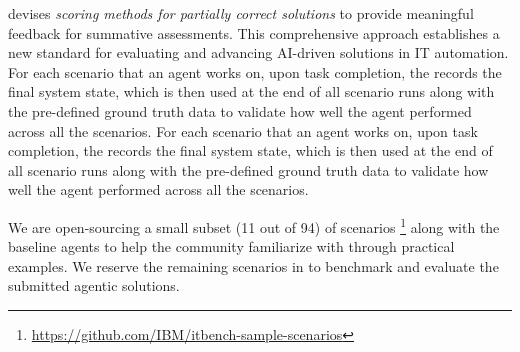 \bench devises \textit{scoring methods for partially correct solutions} to provide meaningful feedback for summative assessments. %
This comprehensive approach establishes a new standard for evaluating and advancing AI-driven solutions in IT automation. For each scenario that an agent works on, upon task completion, the \bench
records the final system state, which is then used at the end of all scenario runs along with the pre-defined ground truth data to validate 
how well the agent performed across all the scenarios. For each scenario that an agent works on, upon task completion, the \bench
records the final system state, which is then used at the end of all scenario runs along with the pre-defined ground truth data to validate 
how well the agent performed across all the scenarios.

We are open-sourcing a small subset (11 out of 94) of scenarios \bench\footnote{\url{https://github.com/IBM/itbench-sample-scenarios}} along with the baseline agents to help the community familiarize with \bench through practical examples. We reserve the remaining scenarios in \bench to benchmark and evaluate the submitted agentic solutions.












